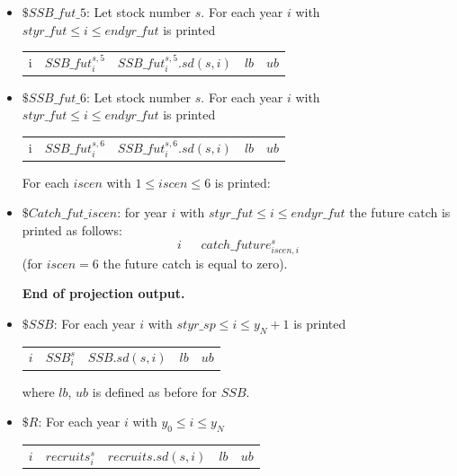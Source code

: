 \documentclass{article}
\begin{document}
\begin{itemize}
\item $\$ SSB\_fut\_5$: Let stock number $s$. For each year $i$ with $styr\_fut \leq i \leq endyr\_fut$ is printed

\begin{center}
    \begin{tabular}{c c c c c}
       i  & $SSB\_fut^{s,5}_i$ & $SSB\_fut^{s,5}_i.sd(s,i)$ 
         & $lb$ & $ub$ \\
    \end{tabular}
\end{center}


\item $\$ SSB\_fut\_6$: Let stock number $s$. For each year $i$ with $styr\_fut \leq i \leq endyr\_fut$ is printed

\begin{center}
    \begin{tabular}{c c c c c}
       i  & $SSB\_fut^{s,6}_i$ & $SSB\_fut^{s,6}_i.sd(s,i)$ 
         & $lb$ & $ub$ \\
    \end{tabular}
\end{center}


For each $iscen$ with $1\leq iscen \leq 6$ is printed:
\item $\$ Catch\_fut\_iscen$: for year $i$ with $styr\_fut \leq i \leq endyr\_fut$ the future catch is printed as follows:
\begin{equation}
    i \ \ \ \ \ \ \ catch\_future^s_{iscen, i}
\end{equation}
(for $iscen=6$ the future catch is equal to zero).

\textbf{End of projection output.}

\item $\$ SSB$: For each year $i$ with $styr\_sp \leq i \leq y_N+1$ is printed 
\begin{center}
    \begin{tabular}{c c c c c }
        $i$ & $SSB^s_i$  &  $SSB.sd(s,i)$ & $lb$ & $ub$\\
          
    \end{tabular}
\end{center}
where $lb$, $ub$ is defined as before for $SSB$.

\item $\$ R$: For each year $i$ with $y_0\leq i \leq y_N$

\begin{center}
    \begin{tabular}{c c c c c}
      $i$   & $recruits^s_i$ &  $recruits.sd(s,i)$ & $lb$ & $ub$\\


\end{tabular}
\end{center}
\end{itemize}
\end{document}
